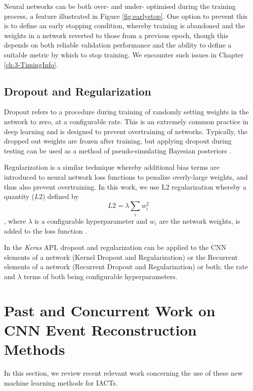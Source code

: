Neural networks can be both over- and under- optimised during the training process, a feature illustrated in Figure \ref{fig:earlystop}. One option to prevent this is to define an early stopping condition, whereby training is abandoned and the weights in a network reverted to those from a previous epoch, though this depends on both reliable validation performance and the ability to define a suitable metric by which to stop training. We encounter such issues in Chapter \ref{ch:3-TimingInfo}.


\subsection{Dropout and Regularization}
Dropout refers to a procedure during training of randomly setting weights in the network to zero, at a configurable rate. This is an extremely common practice in deep learning and is designed to prevent overtraining of networks. Typically, the dropped out weights are frozen after training, but applying dropout during testing can be used as a method of pseudo-simulating Bayesian posteriors \cite{mike}\cite{gal2015}. 

Regularization is a similar technique whereby additional bias terms are introduced to neural network loss functions to penalize overly-large weights, and thus also prevent overtraining. In this work, we use L2 regularization whereby a quantity ($L2$) defined by
\begin{equation}
    L2=\lambda\sum_{i}w_i^2
\end{equation}
, where $\lambda$ is a configurable hyperparameter and $w_i$ are the network weights, is added to the loss function \cite{Keras}.

In the \textit{Keras} \cite{keras} API, dropout and regularization can be applied to the CNN elements of a network (Kernel Dropout and Regularization) or the Recurrent elements of a network (Recurrent Dropout and Regularization) or both; the rate and $\lambda$ terms of both being configurable hyperparameters.

\section{Past and Concurrent Work on CNN Event Reconstruction Methods}
In this section, we review recent relevant work concerning the use of these new machine learning methods for IACTs.

